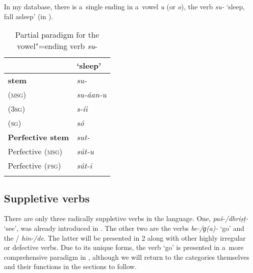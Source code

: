 In my database, there is a~single  ending in a~vowel \textit{u} (or \textit{o}), the verb \textit{su-} `sleep, fall asleep' (in ).


\begin{table}[ht]
\caption{Partial paradigm for the vowel"=ending verb \textit{su}-}

\begin{tabularx}{.5\textwidth}{ l@{\hspace{20pt}} Q }
\lsptoprule
&
`sleep'\\\midrule
\textbf{ stem} &
\textit{su-} \\
 (\textsc{msg}) &
\textit{su-áan-u} \\
 (\textsc{3sg}) &
\textit{s-íi} \\
 (\textsc{sg}) &
\textit{só} \\
\textbf{Perfective stem} &
\textit{sut-} \\
Perfective (\textsc{msg}) &
\textit{sút-u} \\
Perfective (\textsc{fsg}) &
\textit{sút-i} \\\lspbottomrule
\end{tabularx}
\label{tab:8-12}
\end{table}


\subsection{Suppletive verbs}
\label{subsec:8-3-11}


There are only three radically suppletive verbs in the language. One, \textit{paš-/dhriṣṭ-} `see', was already introduced in . The other two are the verbs \textit{be-/ɡ(a)-} `go' and the / \textit{hin-/de}. The latter will be presented in 2 along with other highly irregular or defective verbs. Due to its unique forms, the verb `go' is presented in a~more comprehensive paradigm in , although we will return to the  categories themselves and their functions in the sections to follow.


